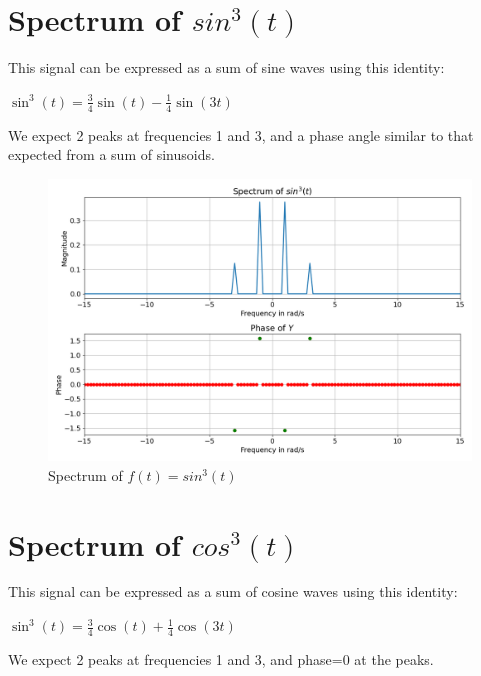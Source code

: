 \documentclass{article}
\begin{document}
\section*{Spectrum of $sin^3(t)$}
This signal can be expressed as a sum of sine waves using this identity:\newline

$\sin^3(t) = \frac{3}{4}\sin(t) - \frac{1}{4}\sin(3t)$\newline

\noindent
We expect 2 peaks at frequencies 1 and 3, and a phase angle similar to that expected from a sum of sinusoids.
\begin{figure}[!tbh]
\centering
\includegraphics[scale=0.4]{plots/sin3.png}
\caption{Spectrum of $f(t) = sin^3(t)$}
\label{fig:5}
\end{figure}

\section*{Spectrum of $cos^3(t)$}
This signal can be expressed as a sum of cosine waves using this identity:\newline

$\sin^3(t) = \frac{3}{4}\cos(t) + \frac{1}{4}\cos(3t)$\newline

\noindent
We expect 2 peaks at frequencies 1 and 3, and phase=0 at the peaks.
\end{document}
